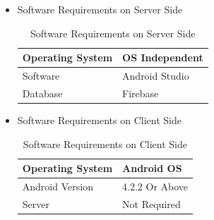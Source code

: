 \documentclass{article}
\begin{document}
\begin{flushleft}
\begin{itemize}
            
           \item Software Requirements on Server Side
           
           
           \begin{center}
          \begin{table}[!ht]
          \renewcommand\thetable{1.5.3}
              \centering
              \caption{Software Requirements on Server Side}
              \label{"   " }
             \begin{tabular}{ | m{3cm} | m{6cm} | }
           
            \hline
             Operating System & OS Independent  \\ \hline
             Software & Android Studio   \\  \hline
             Database & Firebase   \\  \hline
            \end{tabular}
              
          \end{table}
            
            \end{center}
            
            
            
        \item Software Requirements on Client Side
            \begin{center}
          \begin{table}[!ht]
          \renewcommand\thetable{1.5.3}
              \centering
              \caption{Software Requirements on Client Side}
              \label{"   " "  " }
             \begin{tabular}{ | m{3cm} | m{6cm} | }
           
            \hline
             Operating System & Android OS  \\ \hline
             Android Version & 4.2.2 Or Above   \\  \hline
             Server & Not Required   \\  \hline
            \end{tabular}
              
          \end{table}
            
            \end{center}
            
            
            
            
           

\end{itemize}
\end{flushleft}
\end{document}
